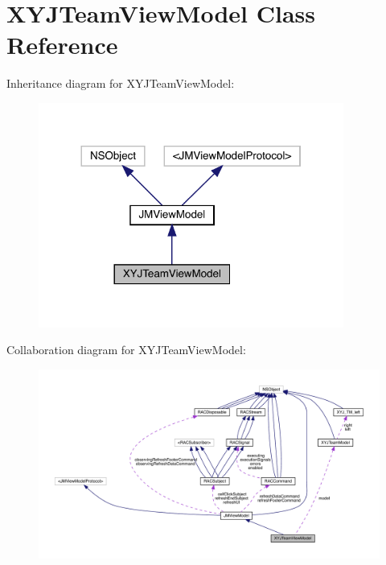 \hypertarget{interface_x_y_j_team_view_model}{}\section{X\+Y\+J\+Team\+View\+Model Class Reference}
\label{interface_x_y_j_team_view_model}


Inheritance diagram for X\+Y\+J\+Team\+View\+Model\+:\nopagebreak
\begin{figure}[H]
\begin{center}
\leavevmode
\includegraphics[width=284pt]{interface_x_y_j_team_view_model__inherit__graph}
\end{center}
\end{figure}


Collaboration diagram for X\+Y\+J\+Team\+View\+Model\+:\nopagebreak
\begin{figure}[H]
\begin{center}
\leavevmode
\includegraphics[width=350pt]{interface_x_y_j_team_view_model__coll__graph}
\end{center}
\end{figure}
